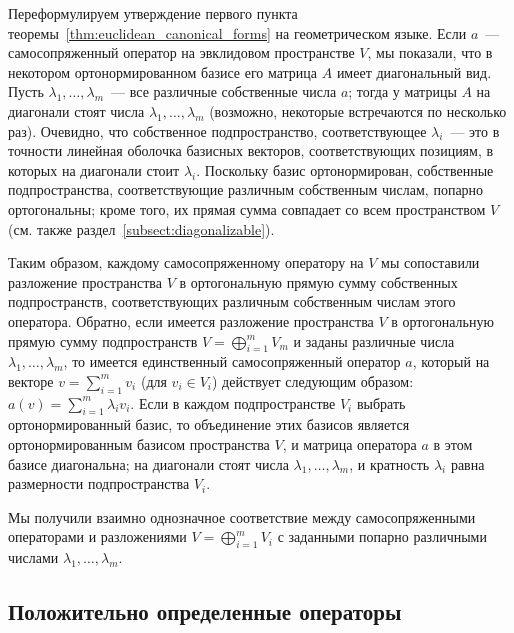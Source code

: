 \begin{remark}\label{rem:self_adjoint_geometry}
Переформулируем утверждение первого пункта
теоремы~\ref{thm:euclidean_canonical_forms} на геометрическом языке.
Если $a$~--- самосопряженный оператор на эвклидовом пространстве $V$,
мы показали, что в некотором ортонормированном базисе его матрица $A$
имеет диагональный вид. Пусть $\lambda_1,\dots,\lambda_m$~--- все
различные собственные числа $a$; тогда у матрицы $A$ на диагонали
стоят числа $\lambda_1,\dots,\lambda_m$ (возможно, некоторые
встречаются по несколько раз). Очевидно, что собственное
подпространство, соответствующее $\lambda_i$~--- это в точности
линейная оболочка базисных векторов, соответствующих позициям, в
которых на диагонали стоит $\lambda_i$. Поскольку базис
ортонормирован, собственные подпространства, соответствующие различным
собственным числам, попарно ортогональны; кроме того, их прямая сумма
совпадает со всем пространством $V$ (см. также
раздел~\ref{subsect:diagonalizable}).

Таким образом, каждому самосопряженному оператору на $V$ мы сопоставили
разложение пространства $V$ в ортогональную прямую сумму
собственных подпространств, соответствующих различным собственным
числам этого оператора.
Обратно, если имеется разложение пространства $V$ в ортогональную
прямую сумму подпространств $V=\bigoplus_{i=1}^{m}V_m$ и заданы
различные числа $\lambda_1,\dots,\lambda_m$, то имеется единственный
самосопряженный оператор $a$, который на векторе $v=\sum_{i=1}^m v_i$ (для
$v_i\in V_i$) действует следующим образом: $a(v) = \sum_{i=1}^m
\lambda_i v_i$. Если в каждом подпространстве $V_i$ выбрать
ортонормированный базис, то объединение этих базисов является
ортонормированным базисом пространства $V$, и матрица оператора $a$ в
этом базисе диагональна; на диагонали стоят числа
$\lambda_1,\dots,\lambda_m$, и кратность $\lambda_i$ равна размерности
подпространства $V_i$.

Мы получили взаимно однозначное соответствие между самосопряженными
операторами и разложениями $V=\bigoplus_{i=1}^m V_i$ с заданными
попарно различными числами $\lambda_1,\dots,\lambda_m$.
\end{remark}

\subsection{Положительно определенные операторы}

\nopagebreak

